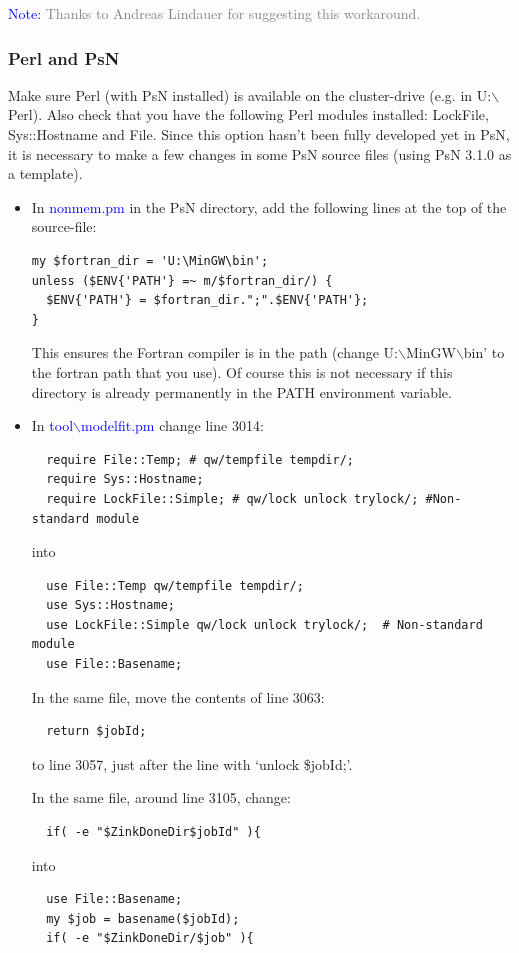 \documentclass[a4,11pt]{report} \usepackage[pdftex]{graphicx}
\begin{document}
{{{\vspace{8pt}
\noindent\scriptsize{\textcolor{Blue}{Note:} \textcolor{Grey}{Thanks
to Andreas Lindauer for suggesting this workaround.  } \normalsize


\subsubsection*{Perl and PsN} Make sure Perl (with
PsN installed) is available on the cluster-drive (e.g. in
U:$\backslash$Perl). Also check that you have the following Perl
modules installed: LockFile, Sys::Hostname and File.  Since this
option hasn't been fully developed yet in PsN, it is necessary to make
a few changes in some PsN source files (using PsN 3.1.0 as a
template).
\begin{itemize}
\item In \textcolor{Blue}{nonmem.pm} in the PsN directory, add the
following lines at the top of the source-file:
\begin{verbatim}
my $fortran_dir = 'U:\MinGW\bin';
unless ($ENV{'PATH'} =~ m/$fortran_dir/) {
  $ENV{'PATH'} = $fortran_dir.";".$ENV{'PATH'};
}
\end{verbatim} This ensures the Fortran compiler is in the path
(change U:$\backslash$MinGW$\backslash$bin' to the fortran path that
you use). Of course this is not necessary if this directory is
already permanently in the PATH environment variable.

\item In \textcolor{Blue}{tool$\backslash$modelfit.pm} change line
3014:
\begin{verbatim}
  require File::Temp; # qw/tempfile tempdir/;
  require Sys::Hostname;
  require LockFile::Simple; # qw/lock unlock trylock/; #Non-standard module
\end{verbatim}
into
\begin{verbatim}
  use File::Temp qw/tempfile tempdir/;
  use Sys::Hostname;
  use LockFile::Simple qw/lock unlock trylock/;  # Non-standard module
  use File::Basename;
\end{verbatim}

In the same file, move the contents of line 3063:
\begin{verbatim}
  return $jobId;
\end{verbatim}
to line 3057, just after the line with `unlock \$jobId;'.

In the same file, around line 3105, change:
\begin{verbatim}
  if( -e "$ZinkDoneDir$jobId" ){
\end{verbatim}
into
\begin{verbatim}
  use File::Basename;
  my $job = basename($jobId);
  if( -e "$ZinkDoneDir/$job" ){
\end{verbatim}


\end{itemize}}}}}
\end{document}
